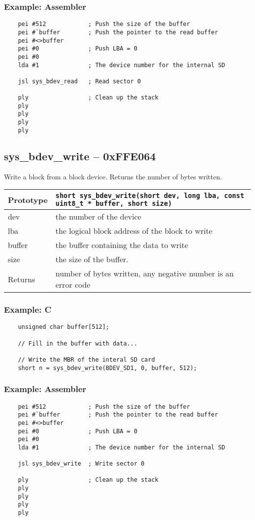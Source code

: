 \subsubsection*{Example: Assembler}
\begin{verbatim}
    pei #512			; Push the size of the buffer
    pei #`buffer		; Push the pointer to the read buffer
    pei #<>buffer
    pei #0				; Push LBA = 0
    pei #0
    lda #1				; The device number for the internal SD

    jsl sys_bdev_read	; Read sector 0

    ply					; Clean up the stack
    ply
    ply
    ply
    ply
\end{verbatim}

\subsection*{sys\_bdev\_write -- 0xFFE064}
Write a block from a block device. Returns the number of bytes written.

\bigskip

\begin{tabular}{|l||l|} \hline
Prototype & \lstinline!short sys_bdev_write(short dev, long lba, const uint8_t * buffer, short size)! \\ \hline
dev & the number of the device \\ \hline
lba & the logical block address of the block to write \\ \hline
buffer & the buffer containing the data to write \\ \hline
size & the size of the buffer. \\ \hline
Returns & number of bytes written, any negative number is an error code \\ \hline
\end{tabular}

\subsubsection*{Example: C}
\begin{lstlisting}
    unsigned char buffer[512];

    // Fill in the buffer with data...
    
    // Write the MBR of the interal SD card
    short n = sys_bdev_write(BDEV_SD1, 0, buffer, 512);
\end{lstlisting}

\subsubsection*{Example: Assembler}
\begin{verbatim}
    pei #512			; Push the size of the buffer
    pei #`buffer		; Push the pointer to the read buffer
    pei #<>buffer
    pei #0				; Push LBA = 0
    pei #0
    lda #1				; The device number for the internal SD

    jsl sys_bdev_write	; Write sector 0

    ply					; Clean up the stack
    ply
    ply
    ply
    ply
\end{verbatim}

